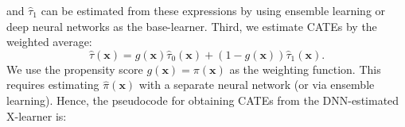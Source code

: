 and \(\widehat{\tau}_{1}\) can be estimated from these expressions by
using ensemble learning or deep neural networks as the base-learner.
Third, we estimate CATEs by the weighted average: \begin{equation}
\hat{\tau}(\mathbf{x})=g(\mathbf{x})\hat{\tau}_0(\mathbf{x})+\left(1-g(\mathbf{x})\right)\hat{\tau}_1(\mathbf{x}).
\end{equation} We use the propensity score
\(g\left(\mathbf{x}\right)=\pi\left(\mathbf{x}\right)\) as the weighting
function. This requires estimating \(\hat{\pi}\left(\mathbf{x}\right)\)
with a separate neural network (or via ensemble learning). Hence, the
pseudocode for obtaining CATEs from the DNN-estimated X-learner is:

\begin{table}[!h]
    \centering
{}
    \label{tab:pseudoX}
\end{table}

